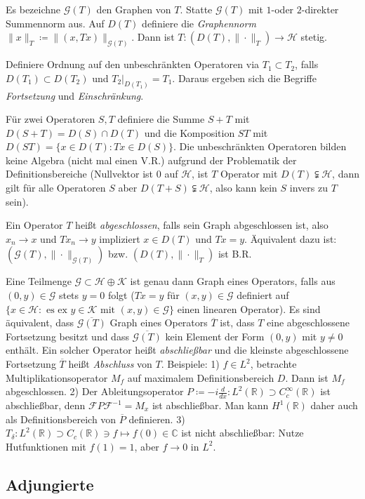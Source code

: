 \documentclass[11pt,a4paper]{scrartcl}
\newcommand{\R}{\mathbb{R}} %
\newcommand{\C}{\mathbb{C}} %
\newcommand{\Hc}{\mathcal{H}}
\newcommand{\Kc}{\mathcal{K}}
\newcommand{\G}{\mathcal{G}}
\newcommand{\F}{\mathcal{F}}
\theoremstyle{plain}
\theoremstyle{definition}
\theoremstyle{remark}
\begin{document}
Es bezeichne $\G(T)$ den Graphen von $T$. Statte $\G(T)$ mit $1$-oder $2$-direkter Summennorm aus. Auf $D(T)$ definiere die \emph{Graphennorm} $\|x\|_T \coloneqq \|(x,Tx)\|_{\G(T)}$. Dann ist $T: (D(T), \|\cdot\|_T) \to \Hc$ stetig.

Definiere Ordnung auf den unbeschränkten Operatoren via $T_1 \subset T_2$, falls $D(T_1)\subset D(T_2)$ und $T_2|_{D(T_1)} = T_1$. Daraus ergeben sich die Begriffe \emph{Fortsetzung} und \emph{Einschränkung}.

Für zwei Operatoren $S,T$ definiere die Summe $S+T$ mit $D(S+T)=D(S)\cap D(T)$ und die Komposition $ST$ mit $D(ST)=\{x\in D(T): Tx\in D(S)\}$. Die unbeschränkten Operatoren bilden keine Algebra (nicht mal einen V.R.) aufgrund der Problematik der Definitionsbereiche (Nullvektor ist $0$ auf $\Hc$, ist $T$ Operator mit $D(T)\subsetneqq \Hc$, dann gilt für alle Operatoren $S$ aber $D(T+S)\subsetneqq \Hc$, also kann kein $S$ invers zu $T$ sein).

Ein Operator $T$ heißt \emph{abgeschlossen}, falls sein Graph abgeschlossen ist, also $x_n\to x$ und $Tx_n\to y$ impliziert $x\in D(T)$ und $Tx=y$. Äquivalent dazu ist: $(\G(T),\|\cdot\|_{\G(T)})$ bzw. $(D(T), \|\cdot\|_T)$ ist B.R.

Eine Teilmenge $\G \subset \Hc \oplus \Kc$ ist genau dann Graph eines Operators, falls aus $(0,y)\in \G$ stets $y=0$ folgt ($Tx=y$ für $(x,y)\in \G$ definiert auf $\{x\in \Hc: \text{ es ex } y\in \Kc \text{ mit } (x,y)\in \G\}$ einen linearen Operator). Es sind äquivalent, dass $\overline{\G(T)}$ Graph eines Operators $\overline{T}$ ist, dass $T$ eine abgeschlossene Fortsetzung besitzt und dass $\overline{\G(T)}$ kein Element der Form $(0,y)$ mit $y\neq 0$ enthält. Ein solcher Operator heißt \emph{abschließbar} und die kleinste abgeschlossene Fortsetzung $\overline{T}$ heißt \emph{Abschluss} von $T$. Beispiele: 1) $f\in L^2$, betrachte Multiplikationsoperator $M_f$ auf maximalem Definitionsbereich $D$. Dann ist $M_f$ abgeschlossen. 2) Der Ableitungsoperator $P\coloneqq -i \frac{d}{dx}: L^2(\R) \supset C_c^\infty(\R)$ ist abschließbar, denn $\F P\F^{-1} = M_x$ ist abschließbar. Man kann $H^1(\R)$ daher auch als Definitionsbereich von $\overline{P}$ definieren. 3) $T_\delta: L^2(\R) \supset C_c(\R) \ni f \mapsto f(0) \in \C$ ist nicht abschließbar: Nutze Hutfunktionen mit $f(1)=1$, aber $f\to 0$ in $L^2$.

\subsection{Adjungierte}
\end{document}
